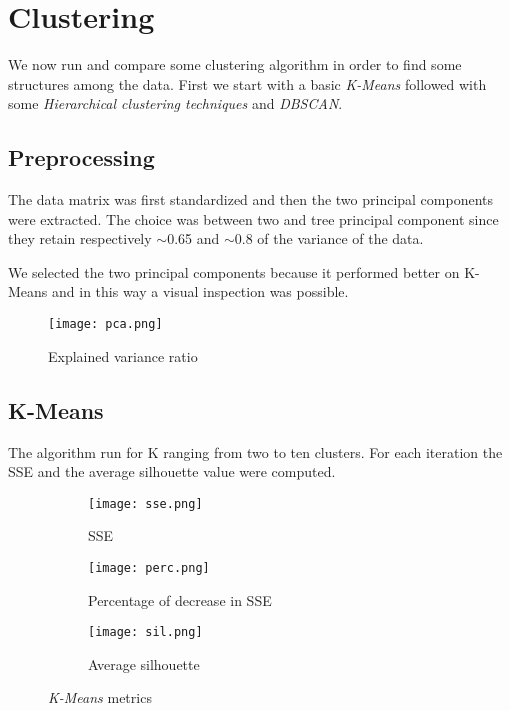 \documentclass{article}
\begin{document}
\section{Clustering}
We now run and compare some clustering algorithm in order to find some structures among the data. First we start with a basic \emph{K-Means} followed with some \emph{Hierarchical clustering techniques} and \emph{DBSCAN}. 
\subsection{Preprocessing}
The data matrix was first standardized and then the two principal components were extracted. The choice was between two and tree principal component since they retain respectively $\sim$0.65 and $\sim$0.8 of the variance of the data.

We selected the two principal components because it performed better on K-Means and in this way a visual inspection was possible.

\begin{figure}[h!]
    \centering
    \texttt{[image: pca.png]}
    \caption{Explained variance ratio}
    \label{fig:pca_img}
\end{figure}

\subsection{K-Means}
The algorithm run for K ranging from two to ten clusters. For each iteration the SSE and the average silhouette value were computed.

\begin{figure}[h!]
     \centering
     \begin{subfigure}{0.49\textwidth}
         \centering
         \texttt{[image: sse.png]}
         \caption{SSE}
         \label{fig:sse_img}
     \end{subfigure}
     \begin{subfigure}{0.49\textwidth}
         \centering
         \texttt{[image: perc.png]}
         \caption{Percentage of decrease in SSE}
         \label{fig:pdiff_img}
     \end{subfigure}
     
     \begin{subfigure}{0.49\textwidth}
         \centering
         \texttt{[image: sil.png]}
         \caption{Average silhouette}
         \label{fig:sil_img}
     \end{subfigure}
     \caption{\emph{K-Means} metrics}
    \label{fig:km_metrics}
\end{figure}
\end{document}

